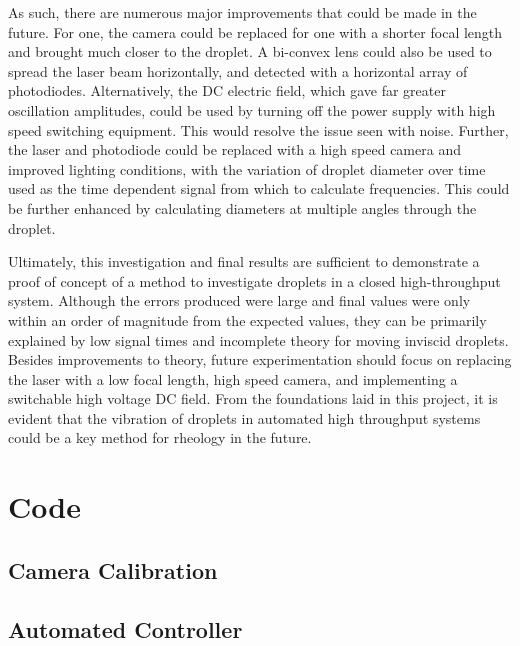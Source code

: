 \documentclass{physics_article_B}
\begin{document}
    As such, there are numerous major improvements that could be made in the future. For one, the camera could be replaced for one with a shorter focal length and brought much closer to the droplet. A bi-convex lens could also be used to spread the laser beam horizontally, and detected with a horizontal array of photodiodes. Alternatively, the DC electric field, which gave far greater oscillation amplitudes, could be used by turning off the power supply with high speed switching equipment. This would resolve the issue seen with noise. Further, the laser and photodiode could be replaced with a high speed camera and improved lighting conditions, with the variation of droplet diameter over time used as the time dependent signal from which to calculate frequencies. This could be further enhanced by calculating diameters at multiple angles through the droplet. 

    Ultimately, this investigation and final results are sufficient to demonstrate a proof of concept of a method to investigate droplets in a closed high-throughput system. Although the errors produced were large and final values were only within an order of magnitude from the expected values, they can be primarily explained by low signal times and incomplete theory for moving inviscid droplets. Besides improvements to theory, future experimentation should focus on replacing the laser with a low focal length, high speed camera, and implementing a switchable high voltage DC field. From the foundations laid in this project, it is evident that the vibration of droplets in automated high throughput systems could be a key method for rheology in the future.
    

\newpage



\newpage
\appendix{}
\section{Code}
    \subsection{Camera Calibration}
        
        
        
    \newpage\subsection{Automated Controller}
        

\end{document}
